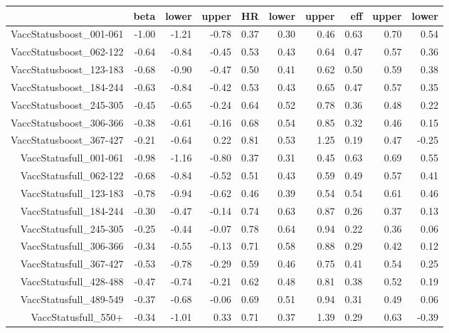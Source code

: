 \begin{table}[ht]
\centering
\begin{tabular}{rrrrrrrrrr}
  \hline
 & beta & lower & upper & HR & lower & upper & eff & upper & lower \\ 
  \hline
VaccStatusboost\_001-061 & -1.00 & -1.21 & -0.78 & 0.37 & 0.30 & 0.46 & 0.63 & 0.70 & 0.54 \\ 
  VaccStatusboost\_062-122 & -0.64 & -0.84 & -0.45 & 0.53 & 0.43 & 0.64 & 0.47 & 0.57 & 0.36 \\ 
  VaccStatusboost\_123-183 & -0.68 & -0.90 & -0.47 & 0.50 & 0.41 & 0.62 & 0.50 & 0.59 & 0.38 \\ 
  VaccStatusboost\_184-244 & -0.63 & -0.84 & -0.42 & 0.53 & 0.43 & 0.65 & 0.47 & 0.57 & 0.35 \\ 
  VaccStatusboost\_245-305 & -0.45 & -0.65 & -0.24 & 0.64 & 0.52 & 0.78 & 0.36 & 0.48 & 0.22 \\ 
  VaccStatusboost\_306-366 & -0.38 & -0.61 & -0.16 & 0.68 & 0.54 & 0.85 & 0.32 & 0.46 & 0.15 \\ 
  VaccStatusboost\_367-427 & -0.21 & -0.64 & 0.22 & 0.81 & 0.53 & 1.25 & 0.19 & 0.47 & -0.25 \\ 
  VaccStatusfull\_001-061 & -0.98 & -1.16 & -0.80 & 0.37 & 0.31 & 0.45 & 0.63 & 0.69 & 0.55 \\ 
  VaccStatusfull\_062-122 & -0.68 & -0.84 & -0.52 & 0.51 & 0.43 & 0.59 & 0.49 & 0.57 & 0.41 \\ 
  VaccStatusfull\_123-183 & -0.78 & -0.94 & -0.62 & 0.46 & 0.39 & 0.54 & 0.54 & 0.61 & 0.46 \\ 
  VaccStatusfull\_184-244 & -0.30 & -0.47 & -0.14 & 0.74 & 0.63 & 0.87 & 0.26 & 0.37 & 0.13 \\ 
  VaccStatusfull\_245-305 & -0.25 & -0.44 & -0.07 & 0.78 & 0.64 & 0.94 & 0.22 & 0.36 & 0.06 \\ 
  VaccStatusfull\_306-366 & -0.34 & -0.55 & -0.13 & 0.71 & 0.58 & 0.88 & 0.29 & 0.42 & 0.12 \\ 
  VaccStatusfull\_367-427 & -0.53 & -0.78 & -0.29 & 0.59 & 0.46 & 0.75 & 0.41 & 0.54 & 0.25 \\ 
  VaccStatusfull\_428-488 & -0.47 & -0.74 & -0.21 & 0.62 & 0.48 & 0.81 & 0.38 & 0.52 & 0.19 \\ 
  VaccStatusfull\_489-549 & -0.37 & -0.68 & -0.06 & 0.69 & 0.51 & 0.94 & 0.31 & 0.49 & 0.06 \\ 
  VaccStatusfull\_550+ & -0.34 & -1.01 & 0.33 & 0.71 & 0.37 & 1.39 & 0.29 & 0.63 & -0.39 \\ 

\end{tabular}
\end{table}
